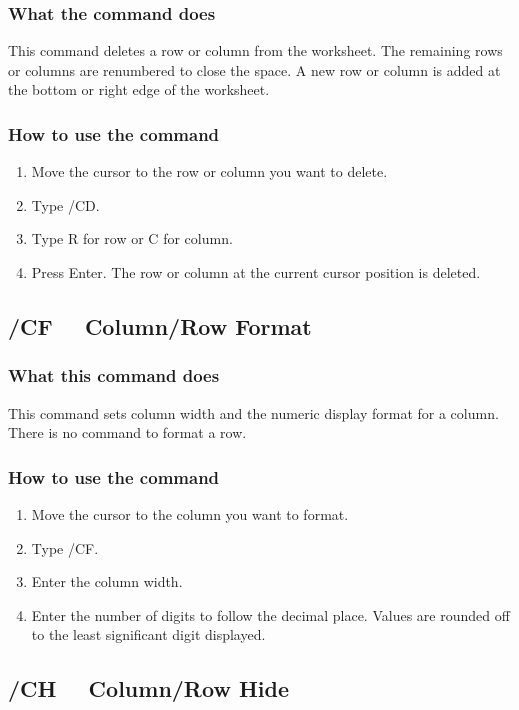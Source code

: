 \subsubsection*{What the command does}
This command deletes a row or column from the worksheet.  The 
remaining rows or columns are renumbered to close the space.  A new 
row or column is added at the bottom or right edge of the worksheet.

\subsubsection*{How to use the command}
\begin{enumerate}
\item{Move the cursor to the row or column you want to delete.}
\item{Type /CD.}
\item{Type R for row or C for column.}
\item{Press Enter.  The row or column at the current cursor position is
deleted.}
\end{enumerate}


\subsection*{/CF \ \ Column/Row Format}
        
\subsubsection*{What this command does}
This command sets column width and the numeric display format for a 
column.  There is no command to format a row.

\subsubsection*{How to use the command}
\begin{enumerate}
\item{Move the cursor to the column you want to format.}
\item{Type /CF.}
\item{Enter the column width.}
\item{Enter the number of digits to follow the decimal place.  Values
are rounded off to the least significant digit displayed.}
\end{enumerate}

\subsection*{/CH \ \  Column/Row Hide}

